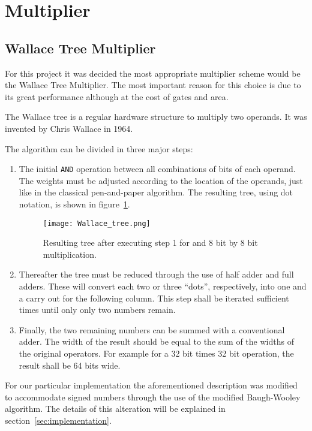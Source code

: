 \newcommand{\AND}{\texttt{AND}\xspace}

\section{Multiplier}


\subsection{Wallace Tree Multiplier}

For this project it was decided the most appropriate multiplier scheme would be the Wallace Tree Multiplier. The most important reason for this choice is due to its great performance although at the cost of gates and area.

The Wallace tree is a regular hardware structure to multiply two operands.
It was invented by Chris Wallace in 1964.

The algorithm can be divided in three major steps:
\begin{enumerate}
\item The initial \AND operation between all combinations of bits of each operand. The weights must be adjusted according to the location of the operands, just like in the classical pen-and-paper algorithm. The resulting tree, using dot notation, is shown in figure~\ref{fig:wallace_tree}.

\begin{figure}[H]
\centering
\texttt{[image: Wallace\_tree.png]}
\caption{Resulting tree after executing step 1 for and 8 bit by 8 bit multiplication.}
\label{fig:wallace_tree}
\end{figure}

\item Thereafter the tree must be reduced through the use of half adder and full adders. These will convert each two or three ``dots'', respectively, into one and a carry out for the following column. This step shall be iterated sufficient times until only only two numbers remain.

\item Finally, the two remaining numbers can be summed with a conventional adder. The width of the result should be equal to the sum of the widths of the original operators. For example for a 32 bit times 32 bit operation, the result shall be 64 bits wide. 
\end{enumerate}  

For our particular implementation the aforementioned description was modified to accommodate signed numbers through the use of the modified Baugh-Wooley algorithm. The details of this alteration will be explained in section~\ref{sec:implementation}.

